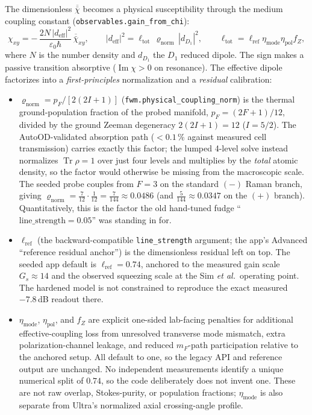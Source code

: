 \documentclass[11pt]{article}
\newcommand{\Tr}{\operatorname{Tr}}
\newcommand{\eff}{\mathrm{eff}}
\newcommand{\code}[1]{\texttt{#1}}
\newcommand{\rhobar}{\bar{\chi}}
\DeclareMathOperator{\Imag}{Im}
\begin{document}
The dimensionless $\overline{\rhobar}$ becomes a physical susceptibility through
the medium coupling constant (\code{observables.gain\_from\_chi}):
\begin{equation}
\chi_{xy}= -\,\frac{2 N\,|d_\eff|^2}{\varepsilon_0\hbar}\,\overline{\rhobar}_{xy},
\qquad
|d_\eff|^2=\ell_{\text{tot}}\,\varrho_{\text{norm}}\,|d_{D_1}|^2,
\qquad
\ell_{\text{tot}}=\ell_{\text{ref}}\eta_{\text{mode}}
\eta_{\text{pol}}f_Z,
\label{eq:chiphys}
\end{equation}
where $N$ is the number density and $d_{D_1}$ the $D_1$ reduced dipole. The sign
makes a passive transition absorptive ($\Imag\chi>0$ on resonance). The effective
dipole factorizes into a \emph{first-principles} normalization and a
\emph{residual} calibration:
\begin{itemize}[leftmargin=1.6em]
  \item $\varrho_{\text{norm}}=p_F/[2(2I+1)]$
  (\code{fwm.physical\_coupling\_norm}) is the thermal ground-population
  fraction of the probed manifold, $p_F=(2F+1)/12$, divided by the ground
  Zeeman degeneracy $2(2I+1)=12$ ($I=5/2$). The AutoOD-validated absorption path
  ($<0.1\,\%$ against measured cell transmission) carries exactly this factor;
  the lumped 4-level solve instead normalizes $\Tr\rho=1$ over just four levels
  and multiplies by the \emph{total} atomic density, so the factor would
  otherwise be missing from the macroscopic scale. The seeded probe couples from
  $F=3$ on the standard $(-)$ Raman branch, giving
  $\varrho_{\text{norm}}=\tfrac{7}{12}\cdot\tfrac{1}{12}
  =\tfrac{7}{144}\approx0.0486$
  (and $\tfrac{5}{144}\approx0.0347$ on the $(+)$ branch). Quantitatively, this
  is the factor the old hand-tuned fudge ``$\text{line\_strength}=0.05$'' was
  standing in for.
  \item $\ell_{\text{ref}}$ (the backward-compatible \code{line\_strength}
  argument; the app's Advanced ``reference residual anchor'') is the
  dimensionless residual left on top. The seeded app default is
  $\ell_{\text{ref}}=0.74$, anchored to
  the measured gain scale $G_s\approx14$ and the observed squeezing scale at
  the Sim \emph{et al.}\ operating point. The hardened model is not constrained
  to reproduce the exact measured $-7.8\,$dB readout there.
  \item $\eta_{\text{mode}}$, $\eta_{\text{pol}}$, and $f_Z$ are explicit
  one-sided lab-facing penalties for additional effective-coupling loss from
  unresolved transverse mode mismatch, extra polarization-channel leakage, and
  reduced $m_F$-path participation relative to the anchored setup. All default
  to one, so the legacy API and reference output are unchanged. No independent
  measurements identify a unique numerical split of $0.74$, so the code
  deliberately does not invent one. These are not raw overlap, Stokes-purity, or
  population fractions; $\eta_{\text{mode}}$ is also separate from Ultra's
  normalized axial crossing-angle profile.
\end{itemize}
\end{document}
